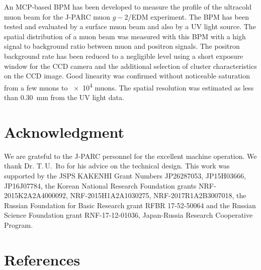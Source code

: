 \documentclass[preprint,3p,twocolumn]{elsarticle}
\begin{document}
An MCP-based BPM has been developed to measure the profile of the
ultracold muon beam for the J-PARC muon $g-2$/EDM experiment.
The BPM has been tested and evaluated by a surface muon beam and
also by a UV light source.  The spatial distribution of a muon
beam was measured with this
BPM with a high signal to background ratio between
muon and positron signals.  The positron background rate has been
reduced to a negligible level using a short exposure window for
the CCD camera and the additional selection of cluster
characteristics on the CCD image.  Good
linearity was confirmed without noticeable saturation from a few
muons to \num{e4} muons.  The spatial resolution was estimated as
less than \SI{.30}{\mm} from the UV light data.

\section*{Acknowledgment}

We are grateful to the J-PARC personnel for the excellent machine
operation.  We thank Dr. T.\,U.~Ito for his advice on the
technical design.  This work was supported by the JSPS KAKENHI
Grant Numbers JP26287053, JP15H03666, JP16J07784, the Korean
National Research Foundation grants NRF-2015K2A2A4000092,
NRF-2015H1A2A1030275, NRF-2017R1A2B3007018, the Russian
Foundation for Basic Research grant RFBR 17-52-50064 and the
Russian Science Foundation grant RNF-17-12-01036, Japan-Russia
Research Cooperative Program.

\section*{References}


\end{document}
